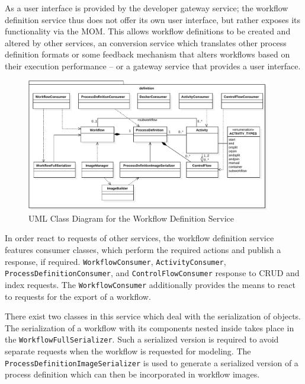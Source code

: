     As a user interface is provided by the developer gateway service; the workflow definition service thus does not offer its own user interface, but rather exposes its functionality via the \ac{MOM}. This allows workflow definitions to be created and altered by other services, \eg an conversion service which translates other process definition formats or some feedback mechanism that alters workflows based on their execution performance -- or a gateway service that provides a user interface.

    \begin{figure}[tbp]
      \centering
      \includegraphics[width=0.95\textwidth]{content/images/class_diagram_definition-crop.pdf}
      \caption{UML Class Diagram for the Workflow Definition Service}
      \label{fig:uml_class_diagram_for_the_definition_service}
    \end{figure}

    In order react to requests of other services, the workflow definition service features consumer classes, which perform the required actions and publish a response, if required. \texttt{WorkflowConsumer}, \texttt{ActivityConsumer}, \texttt{ProcessDefinitionConsumer}, and \texttt{ControlFlowConsumer} response to \ac{CRUD} and index requests. The \texttt{WorkflowConsumer} additionally provides the means to react to requests for the export of a workflow.

    There exist two classes in this service which deal with the serialization of objects.
    The serialization of a workflow with its components nested inside takes place in the \texttt{WorkflowFullSerializer}. Such a serialized version is required to avoid separate requests when the workflow is requested for modeling. The \texttt{ProcessDefinitionImageSerializer} is used to generate a serialized version of a process definition which can then be incorporated in workflow images.

